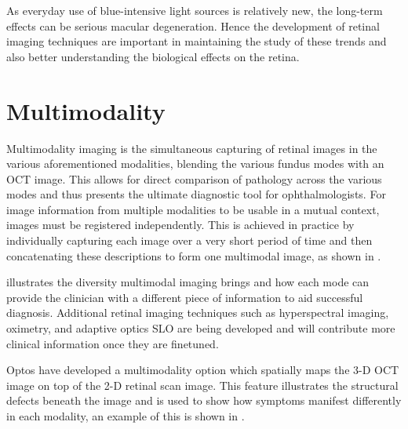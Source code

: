 As everyday use of blue-intensive light sources is relatively new, the long-term effects
can be serious macular degeneration. Hence the development of retinal imaging techniques
are important in maintaining the study of these trends and also better understanding the
biological effects on the retina.

\section{Multimodality}

Multimodality imaging is the simultaneous capturing of retinal images in the various
aforementioned modalities, blending the various fundus modes with an OCT image. This
allows for direct comparison of pathology across the various modes and thus presents
the ultimate diagnostic tool for ophthalmologists. For image information from multiple
modalities to be usable in a mutual context, images must be registered independently.
This is achieved in practice by individually capturing each image over a very short
period of time and then concatenating these descriptions to form one multimodal image,
as shown in . 


 illustrates the diversity multimodal imaging brings and how each mode
can provide the clinician with a different piece of information to aid successful
diagnosis. Additional retinal imaging techniques such as hyperspectral imaging,
oximetry, and adaptive optics SLO are being developed and will contribute more
clinical information once they are finetuned. 

Optos have developed a multimodality option which spatially maps the 3-D OCT
image on top of the 2-D retinal scan image. This feature illustrates the structural
defects beneath the image and is used to show how symptoms manifest differently in
each modality, an example of this is shown in .

